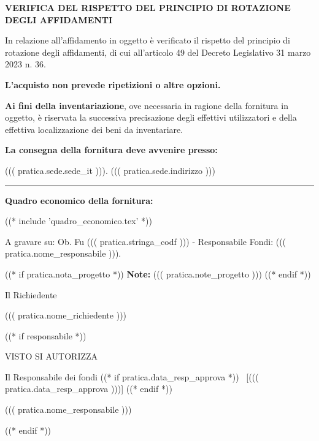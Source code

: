 \textbf{VERIFICA DEL RISPETTO DEL PRINCIPIO DI ROTAZIONE DEGLI AFFIDAMENTI}

In relazione all’affidamento in oggetto è verificato il rispetto del
principio di rotazione degli affidamenti, di cui all’articolo 49 del
Decreto Legislativo 31 marzo 2023 n. 36. 

\textbf{L’acquisto non prevede ripetizioni o altre opzioni.}

\textbf{Ai fini della inventariazione}, ove necessaria in ragione della fornitura
in oggetto, è riservata la successiva precisazione degli effettivi
utilizzatori e della effettiva localizzazione dei beni da inventariare.

\textbf{La consegna della fornitura deve avvenire presso:}

((( pratica.sede.sede_it ))). ((( pratica.sede.indirizzo )))
\par\noindent\rule{\textwidth}{0.4pt}

\textbf{Quadro economico della fornitura: }

((* include 'quadro_economico.tex' *))

\begin{minipage}{\linewidth}
A gravare su: Ob. Fu ((( pratica.stringa_codf ))) - 
Responsabile Fondi: ((( pratica.nome_responsabile ))).

((* if pratica.nota_progetto *))
\vspace{0.5cm}
\textbf{Note:}
	((( pratica.note_progetto )))
((* endif *))

\vspace{0.5cm}
\begin{flushright}
\begin{minipage}[c]{6cm}
\begin{center}
Il Richiedente

((( pratica.nome_richiedente )))

\end{center}
\end{minipage}
\end{flushright}
\end{minipage}

((* if responsabile *))
\begin{minipage}{\linewidth}
\begin{center}
	VISTO SI AUTORIZZA
\end{center}
\vspace{8mm}

\begin{flushright}
\begin{minipage}[c]{12cm}
\begin{center}
Il Responsabile dei fondi
((* if pratica.data_resp_approva *)) ~[((( pratica.data_resp_approva )))] ((* endif *))

((( pratica.nome_responsabile )))

\end{center}
\end{minipage}
\end{flushright}
\end{minipage}
((* endif *))

